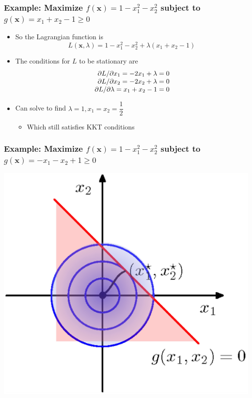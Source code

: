 \documentclass[12pt,notes,mathserif]{beamer}
\begin{document}
\begin{frame}[c]
	\frametitle{Example: Maximize $f(\mathbf{x})=1-x_1^2-x_2^2$ subject to $g(\mathbf{x})=x_1+x_2-1\geqslant{}0$}
	\begin{itemize}
		\item So the Lagrangian function is
		      \[
			      L(\mathbf{x},\lambda)=1-x_1^2-x_2^2+\lambda(x_1+x_2-1)
		      \]
		\item The conditions for $L$ to be stationary are
		      \[
			      \begin{array}{r@{~}l}
				      \partial L/\partial x_1=-2x_1+\lambda=0 \\
				      \partial L/\partial x_2=-2x_2+\lambda=0 \\
				      \partial L/\partial \lambda=x_1+x_2-1=0 \\
			      \end{array}
		      \]
		\item Can solve to find $\lambda=1,x_1=x_2=\dfrac{1}{2}$
		      \begin{itemize}
			      \item Which still satisfies KKT conditions
		      \end{itemize}
	\end{itemize}
\end{frame}


\begin{frame}[c]
	\frametitle{Example: Maximize $f(\mathbf{x})=1-x_1^2-x_2^2$ subject to $g(\mathbf{x})=-x_1-x_2+1\geqslant{}0$}
	\begin{center}
		\includegraphics[width=0.65\linewidth]{fig8/lec837.jpg}
	\end{center}
\end{frame}
\end{document}

